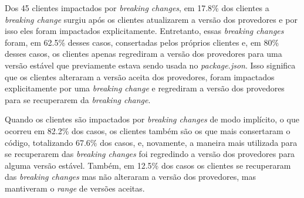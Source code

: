 Dos 45 clientes impactados por \textit{breaking changes}, em 17.8\% dos clientes a \textit{breaking change} surgiu após os clientes atualizarem a versão dos provedores e por isso eles foram impactados explicitamente. Entretanto, essas \textit{breaking changes} foram, em 62.5\% desses casos, consertadas pelos próprios clientes e, em 80\% desses casos, os clientes apenas regrediram a versão dos provedores para uma versão estável que previamente estava sendo usada no \textit{package.json}. Isso significa que os clientes alteraram a versão aceita dos provedores, foram impactados explicitamente por uma \textit{breaking change} e regrediram a versão dos provedores para se recuperarem da \textit{breaking change}.

Quando os clientes são impactados por \textit{breaking changes} de modo implícito, o que ocorreu em 82.2\% dos casos, os clientes também são os que mais consertaram o código, totalizando 67.6\% dos casos, e, novamente, a maneira mais utilizada para se recuperarem das \textit{breaking changes} foi regredindo a versão dos provedores para alguma versão estável. Também, em 12.5\% dos casos os clientes se recuperaram das \textit{breaking changes} mas não alteraram a versão dos provedores, mas mantiveram o \textit{range} de versões aceitas.